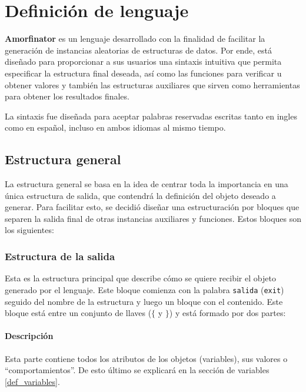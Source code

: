 \chapter{Definición de lenguaje}\label{chapter:def_lenguaje}

\textbf{Amorfinator} es un lenguaje desarrollado con la finalidad de facilitar la 
generación de instancias aleatorias de estructuras de datos. Por ende, está 
diseñado para proporcionar a sus usuarios una sintaxis intuitiva que permita 
especificar la estructura final deseada, así como las funciones para verificar 
u obtener valores y también las estructuras auxiliares que sirven como 
herramientas para obtener los resultados finales.

La sintaxis fue diseñada para aceptar palabras reservadas escritas tanto en
ingles como en español, incluso en ambos idiomas al mismo tiempo.

\section{Estructura general}
La estructura general se basa en la idea de centrar toda la importancia en una 
única estructura de salida, que contendrá la definición del objeto deseado a 
generar. Para facilitar esto, se decidió diseñar una estructuración por bloques 
que separen la salida final de otras instancias auxiliares y funciones.
Estos bloques son los siguientes:

\subsection{Estructura de la salida}
Esta es la estructura principal que describe cómo se quiere recibir el objeto 
generado por el lenguaje. Este bloque comienza con la palabra \texttt{salida} 
(\texttt{exit}) seguido del nombre de la estructura y luego un bloque con el contenido. 
Este bloque está entre un conjunto de llaves (\texttt{$\lbrace$} y \texttt{$\rbrace$}) y está 
formado por dos partes:
\subsubsection{Descripción}
Esta parte contiene todos los atributos de los objetos (variables), sus valores o 
``comportamientos''. De esto último se explicará en la sección de variables \ref{def_variables}. 


